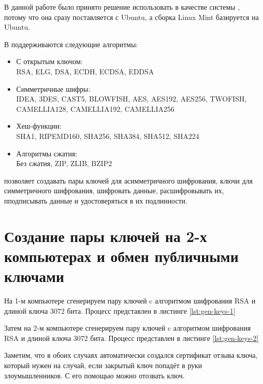 В данной работе было принято решение использовать в качестве  системы , потому что она сразу поставляется с Ubuntu, а сборка Linux Mint базируется на Ubuntu.

В  поддерживаются следующие алгоритмы:
\begin{itemize}
	\item С открытым ключом:\\RSA, ELG, DSA, ECDH, ECDSA, EDDSA
	\item Симметричные шифры:\\IDEA, 3DES, CAST5, BLOWFISH, AES, AES192, AES256, TWOFISH, CAMELLIA128, CAMELLIA192, CAMELLIA256
	\item Хеш-функции:\\SHA1, RIPEMD160, SHA256, SHA384, SHA512, SHA224
	\item Алгоритмы сжатия:\\Без сжатия, ZIP, ZLIB, BZIP2
\end{itemize}

 позволяет создавать пары ключей для асимметричного шифрования, ключи для симметричного шифрования, шифровать данные, расшифровывать их, пподписывать данные и удостоверяться в их подлинности.
             
\section{Создание пары  ключей на 2-х компьютерах и обмен публичными ключами}

На 1-м компьютере сгенерируем пару  ключей c алгоритмом шифрования RSA и длиной ключа 3072 бита. Процесс представлен в листинге \ref{lst:gen-keys-1}



Затем на 2-м компьютере сгенерируем пару  ключей c алгоритмом шифрования RSA и длиной ключа 3072 бита. Процесс представлен в листинге \ref{lst:gen-keys-2}



Заметим, что в обоих случаях автоматически создался сертификат отзыва ключа, который нужен на случай, если закрытый ключ попадёт в руки злоумышленников. С его помощью можно отозвать ключ.

